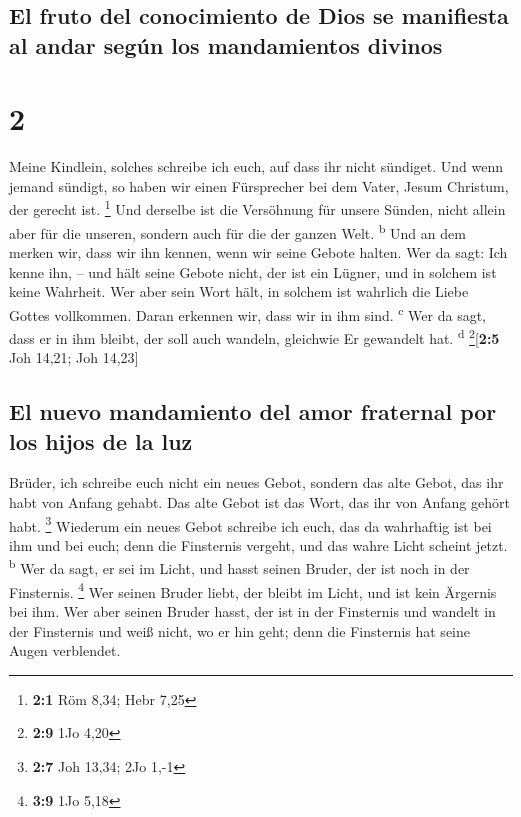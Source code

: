 \hypertarget{el-fruto-del-conocimiento-de-dios-se-manifiesta-al-andar-seguxfan-los-mandamientos-divinos}{%
\subsection{El fruto del conocimiento de Dios se manifiesta al andar
según los mandamientos
divinos}\label{el-fruto-del-conocimiento-de-dios-se-manifiesta-al-andar-seguxfan-los-mandamientos-divinos}}

\hypertarget{section-1}{%
\section{2}\label{section-1}}

 Meine Kindlein, solches schreibe ich euch, auf dass ihr
nicht sündiget. Und wenn jemand sündigt, so haben wir einen Fürsprecher
bei dem Vater, Jesum Christum, der gerecht ist. \footnote{\textbf{2:1}
  Röm 8,34; Hebr 7,25}  Und derselbe ist die Versöhnung
für unsere Sünden, nicht allein aber für die unseren, sondern auch für
die der ganzen Welt. \textsuperscript{b}  Und an dem
merken wir, dass wir ihn kennen, wenn wir seine Gebote halten.
 Wer da sagt: Ich kenne ihn, -- und hält seine Gebote
nicht, der ist ein Lügner, und in solchem ist keine Wahrheit.
 Wer aber sein Wort hält, in solchem ist wahrlich die
Liebe Gottes vollkommen. Daran erkennen wir, dass wir in ihm sind.
\textsuperscript{c}  Wer da sagt, dass er in ihm bleibt,
der soll auch wandeln, gleichwie Er gewandelt hat. \textsuperscript{d}
\footnote{\textbf{2:9} 1Jo 4,20}{[}\textbf{2:5} Joh 14,21; Joh 14,23{]}

\hypertarget{el-nuevo-mandamiento-del-amor-fraternal-por-los-hijos-de-la-luz}{%
\subsection{El nuevo mandamiento del amor fraternal por los hijos de la
luz}\label{el-nuevo-mandamiento-del-amor-fraternal-por-los-hijos-de-la-luz}}

 Brüder, ich schreibe euch nicht ein neues Gebot, sondern
das alte Gebot, das ihr habt von Anfang gehabt. Das alte Gebot ist das
Wort, das ihr von Anfang gehört habt. \footnote{\textbf{2:7} Joh 13,34;
  2Jo 1,-1}  Wiederum ein neues Gebot schreibe ich euch,
das da wahrhaftig ist bei ihm und bei euch; denn die Finsternis vergeht,
und das wahre Licht scheint jetzt. \textsuperscript{b} 
Wer da sagt, er sei im Licht, und hasst seinen Bruder, der ist noch in
der Finsternis. \footnote{\textbf{3:9} 1Jo 5,18}  Wer
seinen Bruder liebt, der bleibt im Licht, und ist kein Ärgernis bei ihm.
 Wer aber seinen Bruder hasst, der ist in der Finsternis
und wandelt in der Finsternis und weiß nicht, wo er hin geht; denn die
Finsternis hat seine Augen verblendet.

